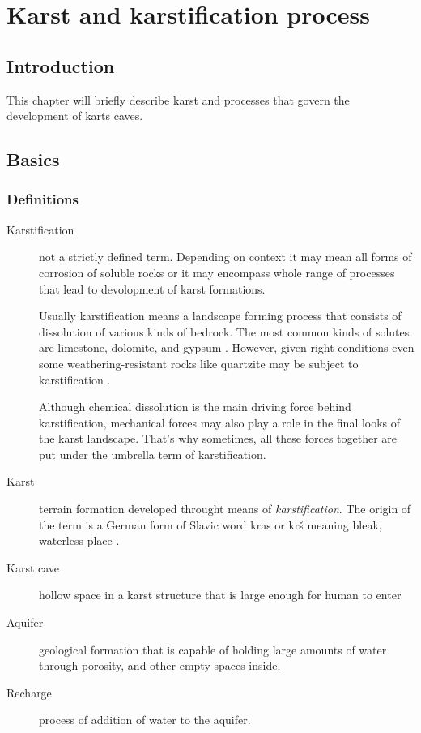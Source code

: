 \chapter{Karst and karstification process}
\section{Introduction}
This chapter will briefly describe karst and processes that govern the
development of karts caves.
\section{Basics}

\subsection{Definitions}
\begin{description}
  \item[Karstification]
    not a strictly defined term. Depending on context it may
    mean all forms of corrosion of soluble rocks or it may encompass whole range of
    processes that lead to devolopment of karst formations.
    
    Usually karstification means a landscape forming process that consists of dissolution
    of various kinds of bedrock. The most common kinds of solutes are limestone,
    dolomite, and gypsum \parencite{karstglossary}. However, given right conditions
    even some weathering-resistant rocks like quartzite may be subject to 
    karstification \parencite{migon2010}.
    
    Although chemical dissolution is the main driving force behind karstification,
    mechanical forces may also play a role in the final looks of the karst landscape.
    That's why sometimes, all these forces together are put under the umbrella term
    of karstification.

  \item[Karst]
    terrain formation developed throught means of
    \emph{karstification}. The origin of the term is a German form of Slavic word
    kras or krš meaning bleak, waterless place \parencite{karstglossary}.
  \item[Karst cave]
    hollow space in a karst structure that is large enough for human to enter
    \parencite{hill1997cave}
  \item[Aquifer]
    geological formation that is capable of holding large amounts of water
    through porosity, and other empty spaces inside.
  \item[Recharge]
    process of addition of water to the aquifer.
\end{description}
